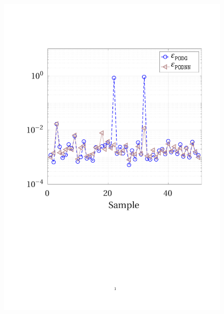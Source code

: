 \documentclass[12pt, a4paper, twoside, openright]{report}
\numberwithin{equation}{chapter}
\theoremstyle{theorem}
\theoremstyle{definition}
\theoremstyle{remark}
\theoremstyle{proposition}
\numberwithin{figure}{chapter}
\begin{document}
		\begin{figure}[H]
			\center
			\includegraphics[scale = 0.42, trim = {1.5cm 9cm 1.5cm 3.5cm}, clip]{poisson2d_2_pointwise_error}
			\hfill

\end{figure}
\end{document}
